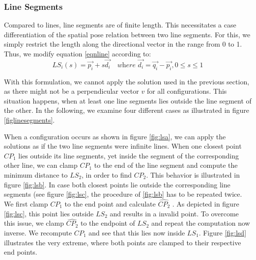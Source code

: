 \subsubsection*{Line Segments}
Compared to lines, line segments are of finite length. This necessitates a case differentiation of the spatial pose relation between two line segments. For this, we simply restrict the length along the directional vector in the range from 0 to 1.
Thus, we modify equation \ref{eqnline} according to:
\begin{equation}
LS_i(s) = \vec{p_i} + s\vec{d_i} \quad \textit{where } \vec{d_i} = \vec{q_i} - \vec{p_i}, 0 \leq s \leq 1
\end{equation}

With this formulation, we cannot apply the solution used in the previous section, as there might not be a perpendicular vector $v$ for all configurations. This situation happens, when at least one line segments lies outside the line segment of the other. In the following, we examine four different cases as illustrated in figure \ref{figlinesegments}.

When a configuration occurs as shown in figure \ref{fig:lsa}, we can apply the solutions as if the two line segments were infinite lines. When one closest point $CP_1$ lies outside its line segments, yet inside the segment of the corresponding other line, we can clamp $CP_1$ to the end of the line segment and compute the minimum distance to $LS_2$, in order to find $CP_2$. This behavior is illustrated in figure \ref{fig:lsb}. In case both closest points lie outside the corresponding line segments (see figure \ref{fig:lsc}, the procedure of \ref{fig:lsb} has to be repeated twice. We first clamp $CP_1$ to the end point and calculate $\hat{CP_2}$ . As depicted in figure \ref{fig:lsc}, this point lies outside $LS_2$ and results in a invalid point. To overcome this issue, we clamp $\hat{CP_2}$ to the endpoint of $LS_2$ and repeat the computation now inverse. We recompute $CP_1$ and see that this lies now inside $LS_1$. Figure \ref{fig:lsd} illustrates the very extreme, where both points are clamped to their respective end points.

